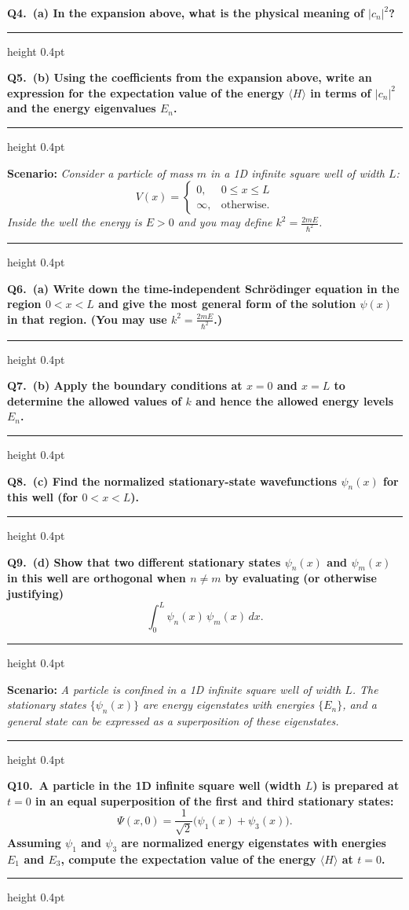 \documentclass[11pt]{article}
\newcommand{\QuestionStyle}[1]{{\large\bfseries\boldmath #1}}
\newcommand{\OEBlock}[2]{%
  \Needspace{5\baselineskip}%
  \noindent
  \begin{minipage}{\linewidth}
    \QuestionStyle{#1.~#2}

    \vspace{0.25em}
    \hrule height 0.4pt
  \end{minipage}
  \vspace{0.75em}
}
\newcommand{\ScenarioBlock}[1]{%
  \Needspace{4\baselineskip}%
  \noindent
  \begin{minipage}{\linewidth}
    {\normalsize\textcolor{ScenarioTeal}{\textbf{Scenario:} \textit{#1}}}
    \vspace{0.25em}
    \hrule height 0.4pt
  \end{minipage}
  \vspace{0.5em}
}
\begin{document}
\OEBlock{Q4}{\textbf{(a)} In the expansion above, what is the physical meaning of $|c_n|^2$?}

\OEBlock{Q5}{\textbf{(b)} Using the coefficients from the expansion above, write an expression for the expectation value of the energy $\langle H\rangle$ in terms of $|c_n|^2$ and the energy eigenvalues $E_n$.}

\ScenarioBlock{Consider a particle of mass $m$ in a 1D infinite square well of width $L$:
\[
V(x)=\begin{cases}
0, & 0\le x\le L\\
\infty, & \text{otherwise.}
\end{cases}
\]
Inside the well the energy is $E>0$ and you may define $k^2=\frac{2mE}{\hbar^2}$.}

\OEBlock{Q6}{\textbf{(a)} Write down the time-independent Schr\"odinger equation in the region $0<x<L$ and give the most general form of the solution $\psi(x)$ in that region. (You may use $k^2=\frac{2mE}{\hbar^2}$.)}

\OEBlock{Q7}{\textbf{(b)} Apply the boundary conditions at $x=0$ and $x=L$ to determine the allowed values of $k$ and hence the allowed energy levels $E_n$.}

\OEBlock{Q8}{\textbf{(c)} Find the normalized stationary-state wavefunctions $\psi_n(x)$ for this well (for $0<x<L$).}

\OEBlock{Q9}{\textbf{(d)} Show that two different stationary states $\psi_n(x)$ and $\psi_m(x)$ in this well are orthogonal when $n\ne m$ by evaluating (or otherwise justifying)
\[
\int_0^L \psi_n(x)\,\psi_m(x)\,dx.
\]}

\ScenarioBlock{A particle is confined in a 1D infinite square well of width $L$. The stationary states $\{\psi_n(x)\}$ are energy eigenstates with energies $\{E_n\}$, and a general state can be expressed as a superposition of these eigenstates.}

\OEBlock{Q10}{A particle in the 1D infinite square well (width $L$) is prepared at $t=0$ in an equal superposition of the first and third stationary states:
\[
\Psi(x,0)=\frac{1}{\sqrt{2}}\big(\psi_1(x)+\psi_3(x)\big).
\]
Assuming $\psi_1$ and $\psi_3$ are normalized energy eigenstates with energies $E_1$ and $E_3$, compute the expectation value of the energy $\langle H\rangle$ at $t=0$.}
\end{document}
